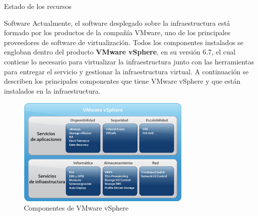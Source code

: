 \begin{chapter}{Estado de los recursos}
\begin{section}{Software}
    \label{subsec:softwareinstalado}
    Actualmente, el software desplegado sobre la infraestructura está formado por los productos de la compañía VMware, uno de los principales proveedores de software de virtualización. Todos los componentes instalados se engloban dentro del producto \textbf{VMware vSphere}, en su versión 6.7, el cual contiene lo necesario para virtualizar la infraestructura junto con las herramientas para entregar el servicio y gestionar la infraestructura virtual. A continuación	se describen los principales componentes que tiene VMware vSphere y que están instalados en la infraestructura.
    \begin{figure}[h]
        \centering
        \includegraphics[width=0.75\textwidth]{imaxes/cap2recursos/contentVSphere}
        \caption{Componentes de VMware vSphere\cite{fotovSphere}}
        \label{fig:vSphere-components}
    \end{figure}
    \FloatBarrier

\end{section}
\end{chapter}
